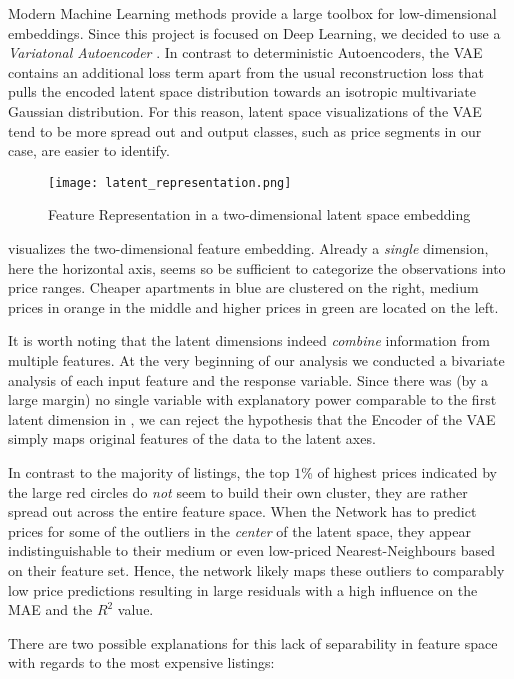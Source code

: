 Modern Machine Learning methods provide a large toolbox for low-dimensional embeddings.
Since this project is focused on Deep Learning, we decided to use a \emph{Variatonal Autoencoder} \citep{kingma2014}.
In contrast to deterministic Autoencoders, the VAE contains an additional loss term apart from the usual reconstruction loss that pulls the encoded latent space distribution towards an isotropic multivariate Gaussian distribution.
For this reason, latent space visualizations of the VAE tend to be more spread out and output classes, such as price segments in our case, are easier to identify.

\begin{figure}[t]
  \centering
  \texttt{[image: latent\_representation.png]}
  \caption{Feature Representation in a two-dimensional latent space embedding}
  \label{fig:latent-representation}
\end{figure}

 visualizes the two-dimensional feature embedding.
Already a \emph{single} dimension, here the horizontal axis, seems so be sufficient to categorize the observations into price ranges.
Cheaper apartments in blue are clustered on the right, medium prices in orange in the middle and higher prices in green are located on the left.

It is worth noting that the latent dimensions indeed \emph{combine} information from multiple features.
At the very beginning of our analysis we conducted a bivariate analysis of each input feature and the response variable.
Since there was (by a large margin) no single variable with explanatory power comparable to the first latent dimension in , we can reject the hypothesis that the Encoder of the VAE simply maps original features of the data to the latent axes.

In contrast to the majority of listings, the top $1$\% of highest prices indicated by the large red circles do \emph{not} seem to build their own cluster, they are rather spread out across the entire feature space.
When the Network has to predict prices for some of the outliers in the \emph{center} of the latent space, they appear indistinguishable to their medium or even low-priced Nearest-Neighbours based on their feature set.
Hence, the network likely maps these outliers to comparably low price predictions resulting in large residuals with a high influence on the MAE and the $R^2$ value.

There are two possible explanations for this lack of separability in feature space with regards to the most expensive listings:

